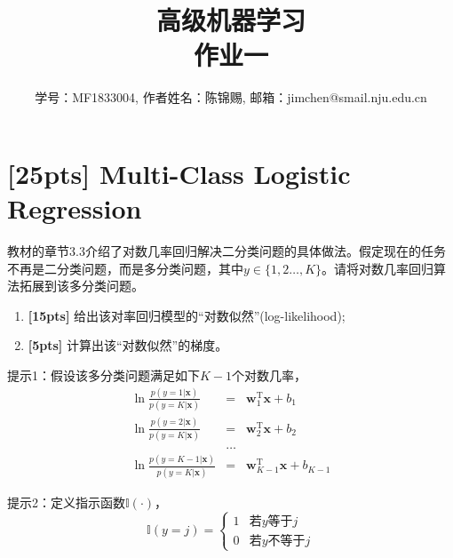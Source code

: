 \documentclass[a4paper,UTF8]{article}
\numberwithin{equation}{section}
\begin{document}
\title{高级机器学习\\
作业一}
\author{学号：MF1833004, 作者姓名：陈锦赐, 邮箱：jimchen@smail.nju.edu.cn}
\maketitle

\section{[25pts] Multi-Class Logistic Regression}
教材的章节3.3介绍了对数几率回归解决二分类问题的具体做法。假定现在的任务不再是二分类问题，而是多分类问题，其中$y\in\{1,2\dots,K\}$。请将对数几率回归算法拓展到该多分类问题。

\begin{enumerate}
	\item \textbf{[15pts]} 给出该对率回归模型的“对数似然”(log-likelihood);
	\item \textbf{[5pts]} 计算出该“对数似然”的梯度。
\end{enumerate}

提示1：假设该多分类问题满足如下$K-1$个对数几率，
\begin{eqnarray*}
	\ln\frac{p(y=1|\mathbf{x})}{p(y=K|\mathbf{x})}&=&\mathbf{w}_1^\mathrm{T}\mathbf{x}+b_1\\
	\ln\frac{p(y=2|\mathbf{x})}{p(y=K|\mathbf{x})}&=&\mathbf{w}_2^\mathrm{T}\mathbf{x}+b_2\\
	&\dots&\\
	\ln\frac{p(y={K-1}|\mathbf{x})}{p(y=K|\mathbf{x})}&=&\mathbf{w}_{K-1}^\mathrm{T}\mathbf{x}+b_{K-1}
\end{eqnarray*}

提示2：定义指示函数$\mathbb{I}(\cdot)$，
$$\mathbb{I}(y=j)=
\begin{cases}
1& \text{若$y$等于$j$}\\
0& \text{若$y$不等于$j$}
\end{cases}$$
\end{document}
